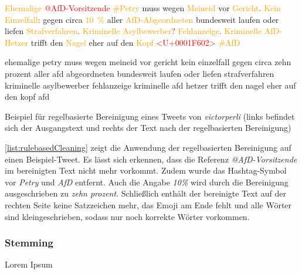 \begin{code}[H]
    \begin{minipage}{0.45\textwidth}
        \small
        \textcolor{orange}{Ehemalige} \textcolor{red}{@AfD-Vorsitzende} \textcolor{orange}{\#Petry} muss wegen \textcolor{orange}{Meineid} vor \textcolor{orange}{Gericht}\textcolor{red}{.} \textcolor{orange}{Kein Einzelfall}\textcolor{red}{:} gegen circa \textcolor{orange}{\SI{10}{\percent}} aller \textcolor{orange}{AfD-Abgeordneten} bundesweit laufen oder liefen \textcolor{orange}{Strafverfahren}\textcolor{red}{.} \textcolor{orange}{Kriminelle Asylbewerber}\textcolor{red}{?} \textcolor{orange}{Fehlanzeige}\textcolor{red}{.} \textcolor{orange}{Kriminelle AfD-Hetzer} trifft den \textcolor{orange}{Nagel} eher auf den \textcolor{orange}{Kopf} \textcolor{red}{<U+0001F602>} \textcolor{orange}{\#AfD}
    \end{minipage}\hfill
    \begin{minipage}{0.45\textwidth}
        \small
        ehemalige petry muss wegen meineid vor gericht kein einzelfall gegen circa zehn prozent aller afd abgeordneten bundesweit laufen oder liefen strafverfahren kriminelle asylbewerber fehlanzeige kriminelle afd hetzer trifft den nagel eher auf den kopf afd
    \end{minipage}\hfill
    \caption[Beispiel -- Regelbasierte Bereinigung]{Beispiel für regelbasierte Bereinigung eines Tweets von \textit{victorperli} (links befindet sich der Ausgangstext und rechts der Text nach der regelbasierten Bereinigung)} \label{list:rulebasedCleaning}
\end{code}

\autoref{list:rulebasedCleaning} zeigt die Anwendung der regelbasierten Bereinigung auf einen Beispiel-Tweet. Es lässt sich erkennen, dass die Referenz \textit{@AfD-Vorsitzende} im bereinigten Text nicht mehr vorkommt. Zudem wurde das Hashtag-Symbol vor \textit{Petry} und \textit{AfD} entfernt. Auch die Angabe \textit{10\%} wird durch die Bereinigung ausgeschrieben zu \textit{zehn prozent}. Schließlich enthält der bereinigte Text auf der rechten Seite keine Satzzeichen mehr, das Emoji am Ende fehlt und alle Wörter sind kleingeschrieben, sodass nur noch korrekte Wörter vorkommen.

\subsubsection{Stemming}

Lorem Ipsum


